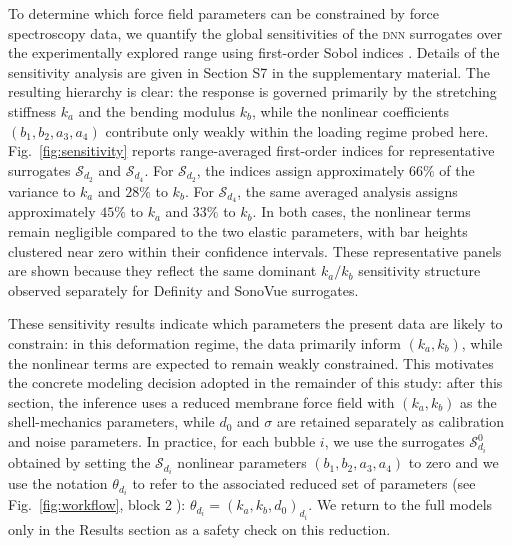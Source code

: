 \documentclass[%
 aip,
 jcp,
 amsmath,amssymb,
 preprint,%
]{revtex4-1}
\begin{document}
To determine which force field parameters can be constrained by force spectroscopy data, we quantify the global sensitivities of the \textsc{dnn} surrogates over the experimentally explored range using first-order Sobol indices \cite{herman2017salib}. Details of the sensitivity analysis are given in Section S7 in the supplementary material. The resulting hierarchy is clear: the response is governed primarily by the stretching stiffness $k_a$ and the bending modulus $k_b$, while the nonlinear coefficients $(b_1,b_2,a_3,a_4)$ contribute only weakly within the loading regime probed here. Fig.~\ref{fig:sensitivity} reports range-averaged first-order indices for representative surrogates $\mathcal{S}_{d_2}$ and $\mathcal{S}_{d_4}$. For $\mathcal{S}_{d_2}$, the indices assign approximately $66\%$ of the variance to $k_a$ and $28\%$ to $k_b$. For $\mathcal{S}_{d_4}$, the same averaged analysis assigns approximately $45\%$ to $k_a$ and $33\%$ to $k_b$. In both cases, the nonlinear terms remain negligible compared to the two elastic parameters, with bar heights clustered near zero within their confidence intervals. These representative panels are shown because they reflect the same dominant $k_a/k_b$ sensitivity structure observed separately for Definity and SonoVue surrogates. 

These sensitivity results indicate which parameters the present data are likely to constrain: in this deformation regime, the data primarily inform $(k_a,k_b)$, while the nonlinear terms are expected to remain weakly constrained. This motivates the concrete modeling decision adopted in the remainder of this study: after this section, the inference uses a reduced membrane force field with $(k_a,k_b)$ as the shell-mechanics parameters, while $d_0$ and $\sigma$ are retained separately as calibration and noise parameters. In practice, for each bubble $i$, we use the surrogates $\mathcal{S}_{d_i}^0$ obtained by setting the $\mathcal{S}_{d_i}$ nonlinear parameters $(b_1, b_2, a_3, a_4)$ to zero and we use the notation $\theta_{d_i}$ to refer to the associated reduced set of parameters (see Fig.~\ref{fig:workflow}, block \textcircled{2}): $\theta_{d_i} = (k_a, k_b, d_0)_{d_i}$. We return to the full models only in the Results section as a safety check on this reduction. 
\end{document}
